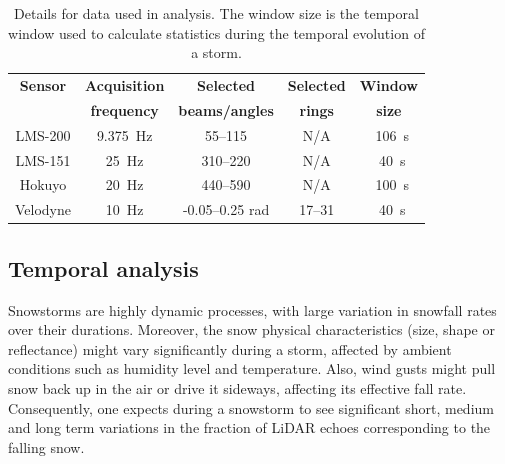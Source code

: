 \begin{table}[htbp]
    \centering
    \begin{tabular}{|c|c|c|c|c|}
        \hline
        \textbf{Sensor}            & \textbf{Acquisition}  & \textbf{Selected}  & \textbf{Selected}  & \textbf{Window} \\
        \textbf{ }                     & \textbf{frequency}  & \textbf{beams/angles}  & \textbf{rings}  & \textbf{size} \\\hline
       LMS-200               & \SI{9.375}{\Hz}                      & 55--115                                    & N/A                         & ~\SI{106}{\second}       \\\hline
        LMS-151               & \SI{25}{\Hz}                           & 310--220                                  & N/A                         & ~\SI{40}{\second}        \\\hline
        Hokuyo               & \SI{20}{\Hz}                          & 440--590                                  & N/A                         & ~\SI{100}{\second}     \\\hline
        Velodyne             & \SI{10}{\Hz}                          & -0.05--0.25 rad                     & 17--31                   & ~\SI{40}{\second}      \\\hline
    \end{tabular}
    \caption{Details for data used in analysis. The window size is the temporal window used to calculate statistics during the temporal evolution of a storm.}
    \label{tab:selectionScans}
\end{table}


\subsection{Temporal analysis}
Snowstorms are highly dynamic processes, with large variation in snowfall rates over their durations. Moreover, the snow physical characteristics (size, shape or reflectance) might vary significantly during a storm, affected by ambient conditions such as humidity level and temperature. Also, wind gusts might pull snow back up in the air or drive it sideways, affecting its effective fall rate. Consequently, one expects during a snowstorm to see significant short, medium and long term variations in the fraction of LiDAR echoes corresponding to the falling snow. 

